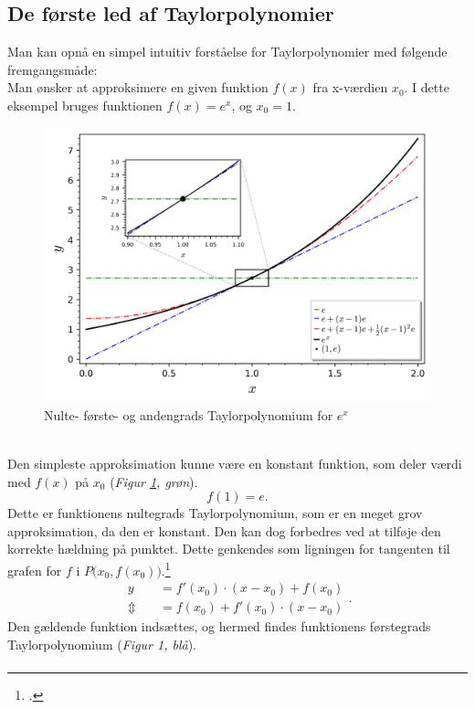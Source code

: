 \documentclass[12pt, a4paper]{article}
\begin{document}
\begin{refsection}
\subsection{De første led af Taylorpolynomier}
Man kan opnå en simpel intuitiv forståelse for Taylorpolynomier med følgende fremgangsmåde:\\
Man ønsker at approksimere en given funktion $f(x)$ fra x-værdien $x_0$. I dette eksempel bruges funktionen $f(x)=e^x$, og $x_0=1$.\\
\begin{figure}[h!]
     \includegraphics[width=\textwidth]{figures/ex-eksempel.png}
     \caption{Nulte- første- og andengrads Taylorpolynomium for $e^x$}
     \label{fig:ex-012tpol}
\end{figure}\\
Den simpleste approksimation kunne være en konstant funktion, som deler værdi med $f(x)$ på $x_0$ (\textit{Figur \ref{fig:ex-012tpol}, grøn}).
\[
f(1)=e
.\] 
Dette er funktionens nultegrads Taylorpolynomium, som er en meget grov approksimation, da den er konstant. Den kan dog forbedres ved at tilføje den korrekte hældning på punktet. Dette genkendes som ligningen for tangenten til grafen for $f$ i $P\big(x_0,f(x_0)\big)$.\footcite[s. 24, frml. 130]{formelsamling}
\[
\begin{aligned}
    y&=f'(x_0) \cdot (x-x_0)+f(x_0)\\
    \Updownarrow\quad &=f(x_0)+f'(x_0) \cdot (x-x_0)
\end{aligned}
.\] 
Den gældende funktion indsættes, og hermed findes funktionens førstegrads Taylorpolynomium  (\textit{Figur 1, blå}).
\[
\begin{aligned}

\end{aligned}\]
\end{refsection}
\end{document}
